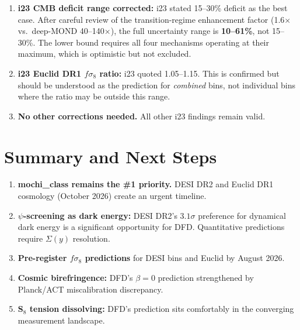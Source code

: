 \documentclass[11pt]{article}
\begin{document}
\begin{tcolorbox}[colback=yellow!5!white, colframe=yellow!70!black,
  title=\textbf{CORRECTIONS FROM i24}]

\begin{enumerate}

\item \textbf{i23 CMB deficit range corrected:} i23 stated 15--30\% deficit
  as the best case. After careful review of the transition-regime
  enhancement factor (1.6$\times$ vs.\ deep-MOND 40--140$\times$),
  the full uncertainty range is \textbf{10--61\%}, not 15--30\%. The
  lower bound requires all four mechanisms operating at their maximum,
  which is optimistic but not excluded.

\item \textbf{i23 Euclid DR1 $f\sigma_8$ ratio:} i23 quoted 1.05--1.15.
  This is confirmed but should be understood as the prediction for
  \emph{combined} bins, not individual bins where the ratio may be
  outside this range.

\item \textbf{No other corrections needed.} All other i23 findings
  remain valid.

\end{enumerate}
\end{tcolorbox}

\section{Summary and Next Steps}

\begin{enumerate}
  \item \textbf{mochi\_class remains the \#1 priority.} DESI DR2 and
    Euclid DR1 cosmology (October 2026) create an urgent timeline.
  \item \textbf{$\psi$-screening as dark energy:} DESI DR2's $3.1\sigma$
    preference for dynamical dark energy is a significant opportunity
    for DFD. Quantitative predictions require $\Sigma(y)$ resolution.
  \item \textbf{Pre-register $f\sigma_8$ predictions} for DESI bins
    and Euclid by August 2026.
  \item \textbf{Cosmic birefringence:} DFD's $\beta = 0$ prediction
    strengthened by Planck/ACT miscalibration discrepancy.
  \item \textbf{S$_8$ tension dissolving:} DFD's prediction sits
    comfortably in the converging measurement landscape.
\end{enumerate}
\end{document}
